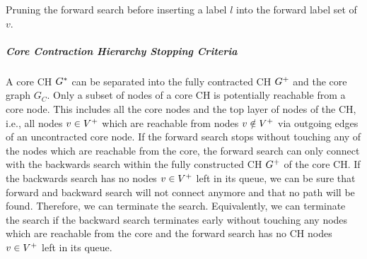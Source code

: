 \begin{algorithm}[hbtp]
	\DontPrintSemicolon



	\caption[\textsc{PruneBackward}]{\label{alg:bw_pruning} Pruning the forward search before inserting a label $l$ into the forward label set of $v$.}
\end{algorithm}


\subparagraph{Core Contraction Hierarchy Stopping Criteria}
A core CH $G^*$ can be separated into the fully contracted CH $G^+$ and the core graph $G_C$. Only a subset of nodes of a core CH is potentially reachable from a core node. This includes all the core nodes and the top layer of nodes of the CH, i.e., all nodes $v \in V^+$ which are reachable from nodes $v \notin V^+$ via outgoing edges of an uncontracted core node. If the forward search stops without touching any of the nodes which are reachable from the core, the forward search can only connect with the backwards search within the fully constructed CH $G^+$ of the core CH. If the backwards search has no nodes $v \in V^+$ left in its queue, we can be sure that forward and backward search will not connect anymore and that no path will be found. Therefore, we can terminate the search. Equivalently, we can terminate the search if the backward search terminates early without touching any nodes which are reachable from the core and the forward search has no CH nodes $v \in V^+$ left in its queue.

